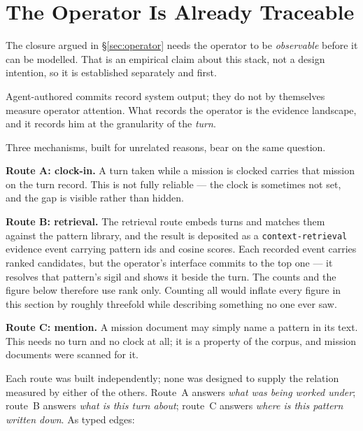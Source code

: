 \section{The Operator Is Already Traceable}\label{sec:turn-chain}


The closure argued in \S\ref{sec:operator} needs the operator to be
\emph{observable} before it can be modelled. That is an empirical claim about
this stack, not a design intention, so it is established separately and first.

Agent-authored commits record system output; they do not by themselves
measure operator attention. What records the operator is the evidence landscape, and it records
him at the granularity of the \emph{turn}.

Three mechanisms, built for unrelated reasons, bear on the same question.

\noindent\textbf{Route A: clock-in.} A turn taken while a mission is clocked carries
that mission on the turn record. This is not fully reliable --- the clock is
sometimes not set, and the gap is visible rather than hidden.

\noindent\textbf{Route B: retrieval.} The retrieval route embeds turns and matches them against
the pattern library, and the result is deposited as a \texttt{context-retrieval}
evidence event carrying pattern ids and cosine scores. Each recorded event carries \ChainCandidates{} ranked candidates, but the
operator's interface commits to the top one --- it resolves that pattern's sigil
and shows it beside the turn. The counts and the figure below therefore use rank
\ChainTopK{} only. Counting all \ChainCandidates{} would inflate every figure in
this section by roughly threefold while describing something no one ever saw.

\noindent\textbf{Route C: mention.} A mission document may simply name a
pattern in its text. This needs no turn and no clock at all; it is a property of
the corpus, and \ChainMissionDocs{} mission documents were scanned for it.

Each route was built independently; none was designed to supply the relation
measured by either of the others. Route~A answers \emph{what was being worked
under}; route~B answers \emph{what is this turn about}; route~C answers
\emph{where is this pattern written down}. As typed edges:

